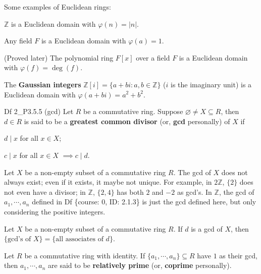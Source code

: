 \documentclass{article}
\begin{document}
\begin{Rmk}{}
    Some examples of Euclidean rings:
    \begin{compactenum}
        \item \textcolor{Th}{$\mathbb{Z}$ is a Euclidean domain with $\varphi(n) = |n|$.}
        \item \textcolor{Th}{Any field $F$ is a Euclidean domain with $\varphi(a) = 1$.}
        \item (Proved later) The polynomial ring $F[x]$ over a field $F$ is a Euclidean domain with $\varphi(f) = \deg(f)$.
        \item \textcolor{Th}{The} \textcolor{Df}{\textbf{Gaussian integers} $\mathbb{Z}[i] = \{a+bi: a,b\in\mathbb{Z}\}$ ($i$ is the imaginary unit)} \textcolor{Th}{is a Euclidean domain with $\varphi(a+bi) = a^2+b^2$.}
    \end{compactenum}
\end{Rmk}

\begin{Df}{Df 2\_P3.5.5 (gcd)}
    Let $R$ be a commutative ring. Suppose $\varnothing\neq X\subseteq R$, then $d\in R$ is said to be a \textbf{greatest common divisor} (or, \textbf{gcd} personally) of $X$ if
    \begin{compactenum}
        \item $d\mid x$ for all $x\in X$;
        \item $c\mid x$ for all $x\in X$ \quad $\implies$\quad $c\mid d$.
    \end{compactenum}
\end{Df}

\begin{Rmk}{}
    \begin{compactenum}
        \item \textcolor{Th}{Let $X$ be a non-empty subset of a commutative ring $R$. The gcd of $X$ does not always exist; even if it exists, it maybe not unique.} For example, in $2\mathbb{Z}$, $\{2\}$ does not even have a divisor; in $\mathbb{Z}$, $\{2,4\}$ has both $2$ and $-2$ as gcd's. \textcolor{Th}{In $\mathbb{Z}$, the gcd of $a_1,\cdots,a_n$ defined in Df \{course: 0, ID: 2.1.3\} is just the gcd defined here, but only considering the positive integers.}
        \item \textcolor{Th}{Let $X$ be a non-empty subset of a commutative ring $R$. If $d$ is a gcd of $X$, then $\{\text{gcd's of } X\} = \{\text{all associates of } d\}$.}
        \item \textcolor{Df}{Let $R$ be a commutative ring with identity. If $\{a_1,\cdots, a_n\}\subseteq R$ have $1$ as their gcd, then $a_1,\cdots, a_n$ are said to be \textbf{relatively prime} (or, \textbf{coprime} personally).}
    \end{compactenum}
\end{Rmk}
\end{document}
